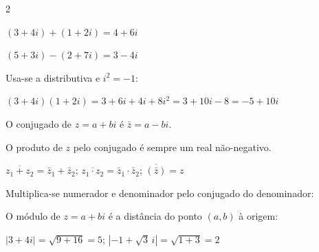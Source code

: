 \documentclass[12pt]{article}
\begin{document}
\begin{multicols}{2}



$(3+4i) + (1+2i) = \boxed{4 + 6i}$

$(5+3i) - (2+7i) = \boxed{3 - 4i}$


Usa-se a distributiva e $i^2 = -1$:


$(3+4i)(1+2i) = 3+6i+4i+8i^2 = 3+10i-8 = \boxed{-5+10i}$


O conjugado de $z = a + bi$ é $\bar{z} = a - bi$.


O produto de $z$ pelo conjugado é sempre um real não-negativo.

$\overline{z_1 + z_2} = \bar{z}_1 + \bar{z}_2$;\quad
$\overline{z_1 \cdot z_2} = \bar{z}_1 \cdot \bar{z}_2$;\quad
$\overline{(\bar{z})} = z$


Multiplica-se numerador e denominador pelo conjugado do denominador:





O módulo de $z = a + bi$ é a distância do ponto $(a,b)$ à origem:



$|3+4i| = \sqrt{9+16} = \boxed{5}$\quad;\quad
$|-1+\sqrt{3}\,i| = \sqrt{1+3} = \boxed{2}$



\end{multicols}
\end{document}
